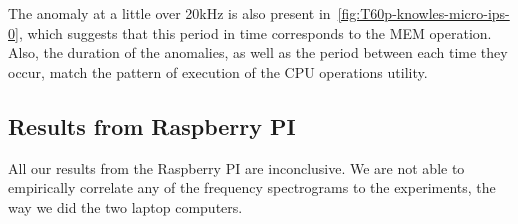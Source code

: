 The anomaly at a little over 20kHz is also present in~\autoref{fig:T60p-knowles-micro-ips-0}, which suggests that this period in time corresponds to the MEM operation.
Also, the duration of the anomalies, as well as the period between each time they occur, match the pattern of execution of the CPU operations utility.


\subsection{Results from Raspberry PI}\label{chp5:subsec:rb_bk_results}
All our results from the Raspberry PI are inconclusive.
We are not able to empirically correlate any of the frequency spectrograms to the experiments, the way we did the two laptop computers.
